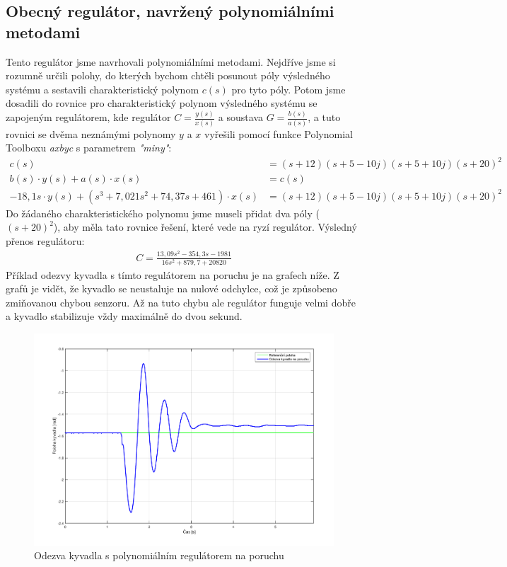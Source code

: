 \documentclass[11pt,a4paper]{article}
\begin{document}
\subsection{Obecný regulátor, navržený polynomiálními metodami}
Tento regulátor jsme navrhovali polynomiálními metodami. Nejdříve jsme si rozumně určili polohy, do kterých bychom chtěli posunout póly výsledného systému a sestavili charakteristický polynom $c(s)$ pro tyto póly. Potom jsme dosadili do rovnice pro charakteristický polynom výsledného systému se zapojeným regulátorem, kde regulátor $C = \frac{y(s)}{x(s)}$ a soustava $G = \frac{b(s)}{a(s)}$, a tuto rovnici se dvěma neznámými polynomy $y$ a $x$ vyřešili pomocí funkce Polynomial Toolboxu \textit{axbyc} s parametrem \textit{"miny"}:
\begin{align*}
c(s) &= (s + 12) (s + 5 - 10j) (s + 5 + 10j) (s + 20)^2	\\
b(s)\cdot y(s) + a(s)\cdot x(s) &= c(s)	\\
-18,1s\cdot y(s) + (s^3 + 7,021s^2 + 74,37s + 461)\cdot x(s) &=  (s + 12) (s + 5 - 10j) (s + 5 + 10j) (s + 20)^2
\end{align*}
Do žádaného charakteristického polynomu jsme museli přidat dva póly ($(s+20)^2$), aby měla tato rovnice řešení, které vede na ryzí regulátor.
\newline
Výsledný přenos regulátoru:
\begin{align*}
C = \frac{13,09s^2 - 354,3s - 1981}{16s^2 + 879,7 + 20820}
\end{align*}
Příklad odezvy kyvadla s tímto regulátorem na poruchu je na grafech níže. Z grafů je vidět, že kyvadlo se neustaluje na nulové odchylce, což je způsobeno zmiňovanou chybou senzoru.
\newline
\newline
Až na tuto chybu ale regulátor funguje velmi dobře a kyvadlo stabilizuje vždy maximálně do dvou sekund.
\begin{figure}[H]
	\centering
    \includegraphics[scale=0.55]{odezva_kyvadlo_poly}
    \caption{Odezva kyvadla s polynomiálním regulátorem na poruchu}
\end{figure}
\end{document}
